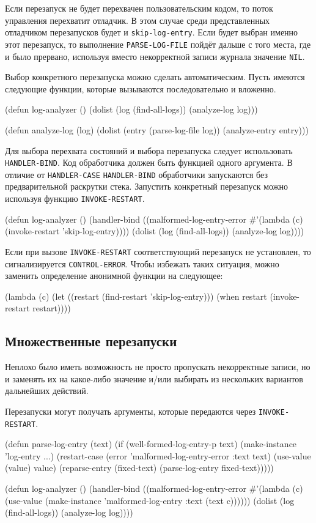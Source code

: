 Если перезапуск не будет перехвачен пользовательским кодом, то поток управления перехватит отладчик. В этом случае среди представленных отладчиком перезапусков будет и \lstinline{skip-log-entry}. Если будет выбран именно этот перезапуск, то выполнение \lstinline{PARSE-LOG-FILE} пойдёт дальше с того места, где и было прервано, используя вместо некорректной записи журнала значение \lstinline{NIL}.

Выбор конкретного перезапуска можно сделать автоматическим. Пусть имеются следующие функции, которые вызываются последовательно и вложенно.
\begin{cllst}{}{}
(defun log-analyzer ()
  (dolist (log (find-all-logs))
    (analyze-log log)))

(defun analyze-log (log)
  (dolist (entry (parse-log-file log))
    (analyze-entry entry)))
\end{cllst}

Для выбора перехвата состояний и выбора перезапуска следует использовать \lstinline{HANDLER-BIND}. Код обработчика должен быть функцией одного аргумента. В отличие от \lstinline{HANDLER-CASE} \lstinline{HANDLER-BIND} обработчики запускаются без предварительной раскрутки стека. Запустить конкретный перезапуск можно используя функцию \lstinline{INVOKE-RESTART}.
\begin{cllst}{}{}
(defun log-analyzer ()
  (handler-bind ((malformed-log-entry-error
                  #'(lambda (c)
                      (invoke-restart 'skip-log-entry))))
    (dolist (log (find-all-logs))
      (analyze-log log))))
\end{cllst}

Если при вызове \lstinline{INVOKE-RESTART} соответствующий перезапуск не установлен, то сигнализируется \lstinline{CONTROL-ERROR}. Чтобы избежать таких ситуация, можно заменить определение анонимной функции на следующее:
\begin{cllst}{}{}
(lambda (c)
  (let ((restart (find-restart 'skip-log-entry)))
    (when restart (invoke-restart restart))))
\end{cllst}

\subsection{Множественные перезапуски}
Неплохо было иметь возможность не просто пропускать некорректные записи, но и заменять их на какое-либо значение и/или выбирать из нескольких вариантов дальнейших действий.

Перезапуски могут получать аргументы, которые передаются через \lstinline{INVOKE-RESTART}.
\begin{cllst}{}{}
(defun parse-log-entry (text)
  (if (well-formed-log-entry-p text)
    (make-instance 'log-entry ...)
    (restart-case (error 'malformed-log-entry-error :text text)
      (use-value (value) value)
      (reparse-entry (fixed-text) (parse-log-entry fixed-text)))))

(defun log-analyzer ()
  (handler-bind ((malformed-log-entry-error
                  #'(lambda (c)
                      (use-value
                       (make-instance 'malformed-log-entry :text (text c))))))
    (dolist (log (find-all-logs))
      (analyze-log log))))
\end{cllst}

